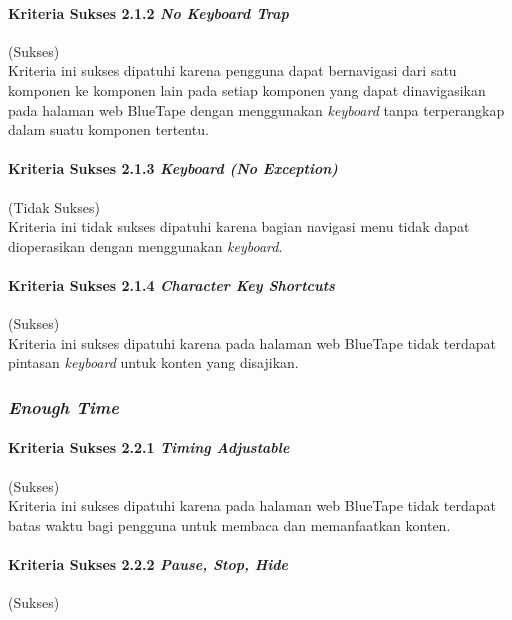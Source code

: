 \paragraph{Kriteria Sukses 2.1.2 \textit{No Keyboard Trap}}
\label{par:kepatuhan_bluetape_kriteria_sukses_2.1.2}
(Sukses)\\

Kriteria ini sukses dipatuhi karena pengguna dapat bernavigasi dari satu komponen ke komponen lain pada setiap komponen yang dapat dinavigasikan pada halaman web BlueTape dengan menggunakan \textit{keyboard} tanpa terperangkap dalam suatu komponen tertentu.

\paragraph{Kriteria Sukses 2.1.3 \textit{Keyboard (No Exception)}}
\label{par:kepatuhan_bluetape_kriteria_sukses_2.1.3}
(Tidak Sukses)\\

Kriteria ini tidak sukses dipatuhi karena bagian navigasi menu tidak dapat dioperasikan dengan menggunakan \textit{keyboard}.

\paragraph{Kriteria Sukses 2.1.4 \textit{Character Key Shortcuts}}
\label{par:kepatuhan_bluetape_kriteria_sukses_2.1.4}
(Sukses)\\

Kriteria ini sukses dipatuhi karena pada halaman web BlueTape tidak terdapat pintasan \textit{keyboard} untuk konten yang disajikan.

\subsubsection{\textit{Enough Time}}
\label{subsubsec:kepatuhan_bluetape_enough_time}

\paragraph{Kriteria Sukses 2.2.1 \textit{Timing Adjustable}}
\label{par:kepatuhan_bluetape_kriteria_sukses_2.2.1}
(Sukses)\\

Kriteria ini sukses dipatuhi karena pada halaman web BlueTape tidak terdapat batas waktu bagi pengguna untuk membaca dan memanfaatkan konten.

\paragraph{Kriteria Sukses 2.2.2 \textit{Pause, Stop, Hide}}
\label{par:kepatuhan_bluetape_kriteria_sukses_2.2.2}
(Sukses)\\

